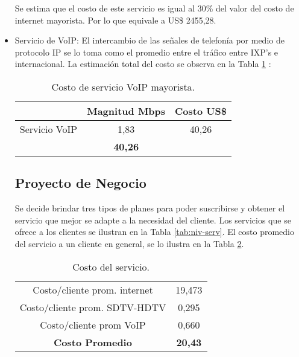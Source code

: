 \begin{itemize}
Se estima que el costo de este servicio es igual al 30\% del valor del costo de internet mayorista. Por lo que equivale a US\$ 2455,28.


\item Servicio de VoIP:
El intercambio de las señales de telefonía por medio de protocolo IP se lo toma como el promedio entre el tráfico entre IXP's e internacional.
La estimación total del costo se observa en la Tabla \ref{tab:costo-voip} :




\begin{table}[H]
  \centering
    \begin{tabular}{|cc|c|}
\cline{1-2}    \rowcolor[rgb]{ .773,  .851,  .945} \multicolumn{1}{|c|}{\textbf{Tipo de trafico}} & \textbf{Magnitud Mbps} & \textbf{Costo US\$} \bigstrut\\
    \hline
    \multicolumn{1}{|c|}{Servicio VoIP} & 1,83  & 40,26 \bigstrut\\
    \hline
    \rowcolor[rgb]{ .773,  .851,  .945} \multicolumn{2}{|c|}{\textbf{Total}} & \textbf{40,26} \bigstrut\\
    \hline
    \end{tabular}%
	\caption{Costo de servicio VoIP mayorista.}
  \label{tab:costo-voip}%
\end{table}%

 
\subsection{Proyecto de Negocio}

Se decide brindar tres tipos de planes para poder suscribirse y obtener el servicio que mejor se adapte a la necesidad del cliente. Los servicios que se ofrece a los clientes se ilustran en la Tabla \ref{tab:niv-serv}.
El costo promedio del servicio a un cliente en general, se lo ilustra en la Tabla \ref{tab:costo-servicio}.


\begin{table}[H]
  \centering
    \begin{tabular}{|c|c|}
    \hline
    \rowcolor[rgb]{ .773,  .851,  .945} \multicolumn{2}{|c|}{\textbf{Costo Promedio del Servicio en US\$}} \bigstrut\\
    \hline
    Costo/cliente prom. internet & 19,473 \bigstrut\\
    \hline
    Costo/cliente prom. SDTV-HDTV & 0,295 \bigstrut\\
    \hline
    Costo/cliente prom VoIP & 0,660 \bigstrut\\
    \hline
    \rowcolor[rgb]{ .773,  .851,  .945} \textbf{Costo Promedio} & \textbf{20,43} \bigstrut\\
    \hline
    \end{tabular}%
	\caption{Costo del servicio.}
  \label{tab:costo-servicio}%
\end{table}%



\end{itemize}
